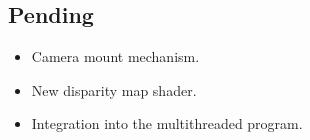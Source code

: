 \subsection{Pending}

\begin{itemize}
	\item Camera mount mechanism.
	\item New disparity map shader.
	\item Integration into the multithreaded program.
\end{itemize}

